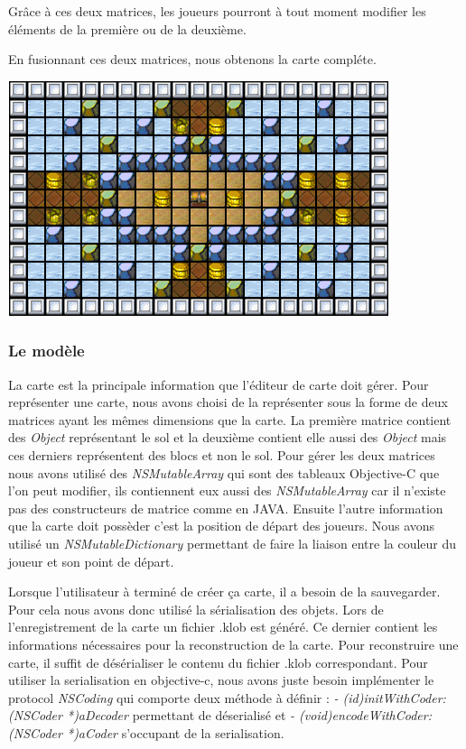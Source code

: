 			Grâce à ces deux matrices, les joueurs pourront à tout moment modifier les éléments de la première ou de la deuxième.
			
			En fusionnant ces deux matrices, nous obtenons la carte compléte.
			\begin{center}
				\includegraphics{./Developpement/Img/image3.png}
			\end{center}
			

	\subsubsection{Le modèle}
		La carte est la principale information que l'éditeur de carte doit gérer. Pour représenter une carte, nous avons choisi de la représenter sous la forme de deux matrices ayant les mêmes dimensions que la carte. La première matrice contient des \textit{Object} représentant le sol et la deuxième contient elle aussi des \textit{Object} mais ces derniers représentent des blocs et non le sol. Pour gérer les deux matrices nous avons utilisé des \textit{NSMutableArray} qui sont des tableaux Objective-C que l'on peut modifier, ils contiennent eux aussi des \textit{NSMutableArray} car il n'existe pas des constructeurs de matrice comme en JAVA. Ensuite l'autre information que la carte doit possèder c'est la position de départ des joueurs. Nous avons utilisé un \textit{NSMutableDictionary} permettant de faire la liaison entre la couleur du joueur et son point de départ. 
			
		Lorsque l'utilisateur à terminé de créer ça carte, il a besoin de la sauvegarder. Pour cela nous avons donc utilisé la sérialisation des objets. Lors de l'enregistrement de la carte un fichier \og .klob \fg  est généré. Ce dernier contient les informations nécessaires pour la reconstruction de la carte. Pour reconstruire une carte, il suffit de désérialiser le contenu du fichier \og .klob \fg correspondant. Pour utiliser la serialisation en 
		\gls{objective-c}, nous avons juste besoin
		 implémenter le protocol \textit{NSCoding} qui comporte deux méthode à définir : 
		\textit{- (id)initWithCoder:(NSCoder *)aDecoder} permettant de déserialisé et \textit{- (void)encodeWithCoder:(NSCoder *)aCoder} s'occupant de la serialisation.
	
